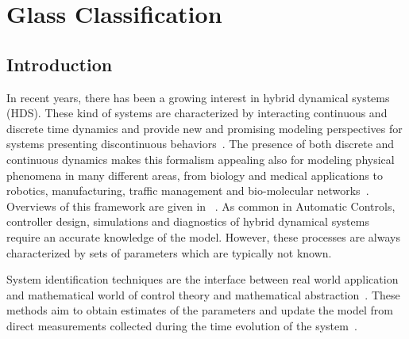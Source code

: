 
\chapter{Glass Classification}

\label{chap:glassclassification}
\minitoc

\thispagestyle{empty}

\newpage
\section{Introduction}
In recent years, there has been a growing interest in hybrid dynamical systems (HDS). These kind of systems are characterized by interacting continuous and discrete time dynamics and provide new and promising modeling perspectives for systems presenting discontinuous behaviors~\cite{van2000introduction}. The presence of both discrete and continuous dynamics makes this formalism appealing also for modeling physical phenomena in many different areas, from biology and medical applications to robotics, manufacturing, traffic management and bio-molecular networks~\cite{Aihara4893, Bortolussi2018}. 
Overviews of this framework are given in ~\cite{van2000introduction, haddad2006impulsive,goebel2009hybrid,Goebel2012}.
As common in Automatic Controls, controller design, simulations and diagnostics of hybrid dynamical systems require an accurate knowledge of the model. However, these {processes} are always characterized by sets of parameters which are typically not known.

System identification techniques are the interface between real world application and mathematical world of control theory and mathematical abstraction~\cite{LJUNG20101}. These methods aim to obtain estimates of the parameters and update the model from direct measurements collected during the time evolution of the system~\cite{SIS}.

